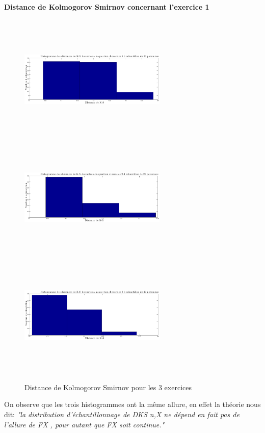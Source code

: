 \documentclass[a4paper, 11pt]{article}
\begin{document}
	\paragraph{Distance de Kolmogorov Smirnov concernant l'exercice 1} 
   \begin{figure} [H]
	\begin{center}
		\includegraphics[height=6cm, width = 7cm]{Fig/Q2B4.eps}
		\includegraphics[height=6cm, width = 7cm]{Fig/Q2B5.eps}
		\includegraphics[height=6cm, width = 7cm]{Fig/Q2B6.eps}
		\caption{Distance de Kolmogorov Smirnov pour les 3 exercices}
		\label{Q2B3}
	\end{center}	
	\end{figure}
	On observe que les trois histogrammes ont la même allure, en effet la théorie nous dit:\textit{ "la distribution d’échantillonnage de DKS
n,X ne dépend en fait pas de l’allure de FX , pour autant que FX soit continue."} 
\newpage
\appendix
\end{document}
